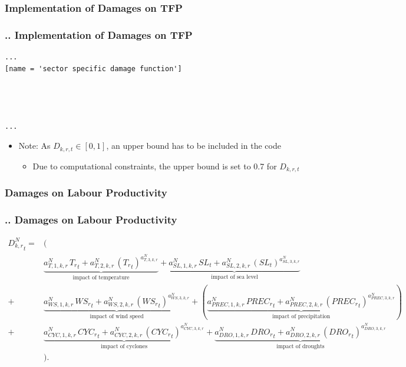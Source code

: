 \documentclass[11pt,aspectratio=169]{beamer}
\begin{document}
\subsubsection{Implementation of Damages on TFP}
\begin{frame}[fragile]
\frametitle{{\thesection.\thesubsection.\thesubsubsection} Implementation of Damages on TFP}
\begin{lstlisting}[frame = single]
...
[name = 'sector specific damage function']




...
\end{lstlisting}
\begin{itemize}
	\item Note: As $D_{k,r,t} \in [0,1]$, an upper bound has to be included in the code
	\begin{itemize}
		\item Due to computational constraints, the upper bound is set to 0.7 for $D_{k,r,t}$
	\end{itemize}
\end{itemize}
\end{frame}

\subsubsection{Damages on Labour Productivity}
\begin{frame}
\frametitle{{\thesection.\thesubsection.\thesubsubsection} Damages on Labour Productivity}
\scriptsize
\begin{align*}
{{D^{N}_{k,r}}_{t}}=& \Big( \nonumber \\
&\underbrace{{{a^{N}_{T,1,k,r}}} \, {{T_{r}}_{t}}+{{a^{N}_{T,2,k,r}}}\, \left({T_{r}}_{t}\right)^{a^{N}_{T,3,k,r}}}_{\mbox{impact of temperature}} + 
\underbrace{{{a^{N}_{SL,1,k,r}}}\, {{SL}_{t}}+{{a^{N}_{SL,2,k,r}}}\, \left({SL}_{t}\right)^{{{a^{N}_{SL,3,k,r}}}}}_{\mbox{impact of sea level}} \nonumber \\
+ & \underbrace{{{a^{N}_{WS,1,k,r}}}\, {{WS_{r}}_{t}}+{{a^{N}_{WS,2,k,r}}}\, \left({WS_{r}}_{t}\right)^{{{a^{N}_{WS,3,k,r}}}}}_{\mbox{impact of wind speed}} 
+ (\underbrace{{{a^{N}_{PREC,1,k,r}}} \, {{PREC_{r}}_{t}}+{{a^{N}_{PREC,2,k,r}}}\, \left({PREC_{r}}_{t}\right)^{{{a^{N}_{PREC,3,k,r}}}}}_{\mbox{impact of precipitation}}) \,  \nonumber \\
+ & \underbrace{{{a^{N}_{CYC,1,k,r}}}\, {{CYC_{r}}_{t}}+{{a^{N}_{CYC,2,k,r}}}\, \left({CYC_{r}}_{t}\right)^{{{a^{N}_{CYC,3,k,r}}}}}_{\mbox{impact of cyclones}}
+ \underbrace{{{a^{N}_{DRO,1,k,r}}} \, {{DRO_{r}}_{t}}+{{a^{N}_{DRO,2,k,r}}}\, \left({DRO_{r}}_{t}\right)^{{{a^{N}_{DRO,3,k,r}}}}}_{\mbox{impact of droughts}} \nonumber \\
&\Big).
\end{align*}
\end{frame}
\end{document}
